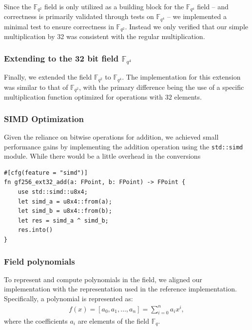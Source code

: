 \documentclass[11pt]{report}
\theoremstyle{definition}
\theoremstyle{plain}
\begin{document}
Since the $\mathbb{F}_{q^2}$ field is only utilized as a building block for the $\mathbb{F}_{q^4}$ field -- and correctness is primarily validated through tests on $\mathbb{F}_{q^4}$ -- we implemented a minimal test to ensure correctness in $\mathbb{F}_{q^2}$. Instead we only verified that our simple multiplication by 32 was consistent with the regular multiplication.




\subsubsection{Extending to the 32 bit field $\mathbb{F}_{q^4}$}\label{sec:gf_256_32_bit_field}
Finally, we extended the field $\mathbb{F}_{q^2}$ to $\mathbb{F}_{q^4}$. The implementation for this extension was similar to that of $\mathbb{F}_{q^2}$, with the primary difference being the use of a specific multiplication function optimized for operations with $32$ elements.

\subsubsection{SIMD Optimization}
Given the reliance on bitwise operations for addition, we achieved small performance gains by implementing the addition operation using the \texttt{std::simd} module. While there would be a little overhead in the conversions

\begin{verbatim}
#[cfg(feature = "simd")]
fn gf256_ext32_add(a: FPoint, b: FPoint) -> FPoint {
    use std::simd::u8x4;
    let simd_a = u8x4::from(a);
    let simd_b = u8x4::from(b);
    let res = simd_a ^ simd_b;
    res.into()
}
\end{verbatim}

\subsubsection{Field polynomials}\label{sub:field_polynomials}
To represent and compute polynomials in the field, we aligned our implementation with the representation used in the reference implementation. Specifically, a polynomial is represented as:
\begin{align*}
  f(x) = [a_0, a_1, \dots, a_n] = \sum_{i=0}^{n} a_i x^i,
\end{align*}
where the coefficients $a_i$ are elements of the field $\mathbb{F}_{q}$.
\end{document}
